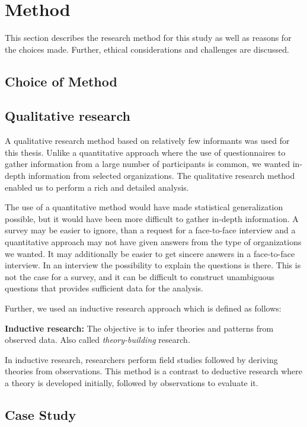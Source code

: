 \chapter{Method}
\label{chp:method}
This section describes the research method for this study as well as reasons for the choices made. Further, ethical considerations and challenges are discussed.
\section{Choice of Method}


\section{Qualitative research}
\label{sec:qualitativeresearch}
A qualitative research method based on relatively few informants was used for this thesis. Unlike a quantitative approach where the use of questionnaires to gather information from a large number of participants is common, we wanted in-depth information from selected organizations. The qualitative research method enabled us to perform a rich and detailed analysis. 

The use of a quantitative method would have made statistical generalization possible, but it would have been more difficult to gather in-depth information. A survey may be easier to ignore, than a request for a face-to-face interview and a quantitative approach may not have given answers from the type of organizations we wanted. It may additionally be easier to get sincere answers in a face-to-face interview. In an interview the possibility to explain the questions is there. This is not the case for a survey, and it can be difficult to construct unambiguous questions that provides sufficient data for the analysis.

\pagebreak
Further, we used an inductive research approach which is defined as follows\cite{bhattacherjee2012social}: 

\textbf{Inductive research:} The objective is to infer theories and patterns from observed data. Also called \emph{theory-building} research.

In inductive research, researchers perform field studies followed by deriving theories from observations. This method is a contrast to deductive research where a theory is developed initially, followed by observations to evaluate it\cite{oates2005researching}.

\section{Case Study}
\label{sec:caseStudy}


